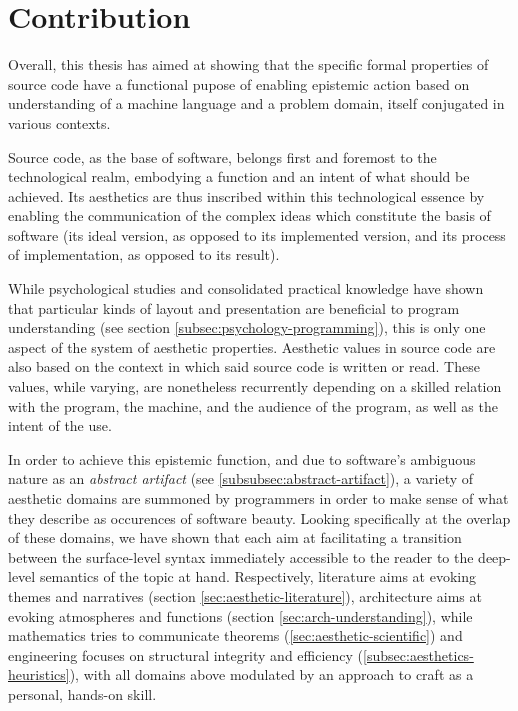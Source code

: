 \section{Contribution}
\label{sec:conclusion-contribution}

Overall, this thesis has aimed at showing that the specific formal properties of source code have a functional pupose of enabling epistemic action based on understanding of a machine language and a problem domain, itself conjugated in various contexts.

Source code, as the base of software, belongs first and foremost to the technological realm, embodying a function and an intent of what should be achieved. Its aesthetics are thus inscribed within this technological essence by enabling the communication of the complex ideas which constitute the basis of software (its ideal version, as opposed to its implemented version, and its process of implementation, as opposed to its result).

While psychological studies and consolidated practical knowledge have shown that particular kinds of layout and presentation are beneficial to program understanding (see section \ref{subsec:psychology-programming}), this is only one aspect of the system of aesthetic properties. Aesthetic values in source code are also based on the context in which said source code is written or read. These values, while varying, are nonetheless recurrently depending on a skilled relation with the program, the machine, and the audience of the program, as well as the intent of the use.

In order to achieve this epistemic function, and due to software's ambiguous nature as an \emph{abstract artifact} (see \ref{subsubsec:abstract-artifact}), a variety of aesthetic domains are summoned by programmers in order to make sense of what they describe as occurences of software beauty. Looking specifically at the overlap of these domains, we have shown that each aim at facilitating a transition between the surface-level syntax immediately accessible to the reader to the deep-level semantics of the topic at hand. Respectively, literature aims at evoking themes and narratives (section \ref{sec:aesthetic-literature}), architecture aims at evoking atmospheres and functions (section \ref{sec:arch-understanding}), while mathematics tries to communicate theorems (\ref{sec:aesthetic-scientific}) and engineering focuses on structural integrity and efficiency (\ref{subsec:aesthetics-heuristics}), with all domains above modulated by an approach to craft as a personal, hands-on skill.

